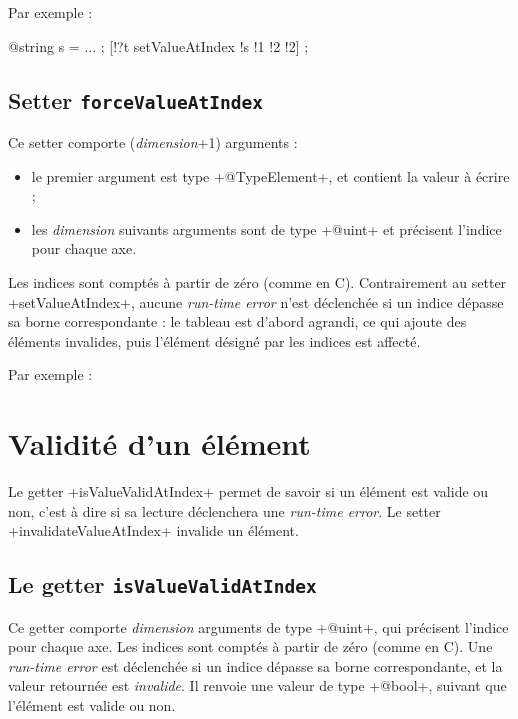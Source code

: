 Par exemple :
\begin{galgas3}
  @string s = ... ;
  [!?t setValueAtIndex !s !1 !2 !2] ;
\end{galgas3}





\subsection{Setter \texttt{forceValueAtIndex}}

Ce setter comporte (\emph{dimension}+1) arguments :
\begin{itemize}
  \item le premier argument est type \ggst+@TypeElement+, et contient la valeur à écrire ;
  \item les \emph{dimension} suivants arguments sont de type \ggst+@uint+ et précisent l'indice pour chaque axe.
\end{itemize}

Les indices sont comptés à partir de zéro (comme en C). Contrairement au setter \ggst+setValueAtIndex+, aucune \emph{run-time error} n'est déclenchée si un indice dépasse sa borne correspondante : le tableau est d'abord agrandi, ce qui ajoute des éléments invalides, puis l'élément désigné par les indices est affecté.

Par exemple :
\begin{galgas3}
  @string s = ... ;
  [}?t forceValueAtIndex !s !5 !4 !4] ;
\end{galgas3}





\section{Validité d'un élément}

Le getter \ggst+isValueValidAtIndex+ permet de savoir si un élément est valide ou non, c'est à dire si sa lecture déclenchera une \emph{run-time error}. Le setter \ggst+invalidateValueAtIndex+ invalide un élément.

\subsection{Le getter \texttt{isValueValidAtIndex}}

Ce getter comporte \emph{dimension} arguments de type \ggst+@uint+, qui précisent l'indice pour chaque axe. Les indices sont comptés à partir de zéro (comme en C). Une \emph{run-time error} est déclenchée si un indice dépasse sa borne correspondante, et la valeur retournée est \emph{invalide}. Il renvoie une valeur de type \ggst+@bool+, suivant que l'élément est valide ou non.

